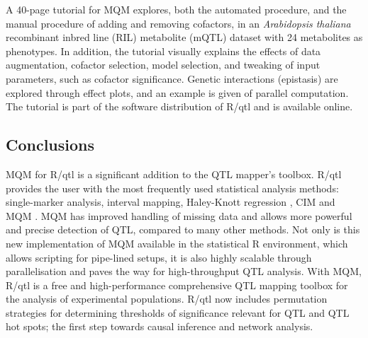 \documentclass[8pt, twoside, a5paper]{report}
\begin{document}
A 40-page tutorial for MQM explores, both the automated procedure, and the manual procedure of adding and removing 
cofactors, in an \emph{Arabidopsis thaliana} recombinant inbred line (RIL) metabolite (mQTL) dataset with 24 metabolites 
as phenotypes\cite{Fu:2007}. In addition, the tutorial visually explains the effects of data augmentation, cofactor 
selection, model selection, and tweaking of input parameters, such as cofactor significance. Genetic interactions 
(epistasis) are explored through effect plots, and an example is given of parallel computation. The tutorial is part 
of the software distribution of R/qtl and is available online.

\subsection{Conclusions}
MQM for R/qtl is a significant addition to the QTL mapper's toolbox. R/qtl provides the user with the most frequently 
used statistical analysis methods: single-marker analysis, interval mapping, Haley-Knott regression \cite{Haley:1992}, 
CIM \cite{Zeng:1994} and MQM \cite{Jansen:1994a}.  MQM has improved handling of missing data and allows more powerful 
and precise detection of QTL, compared to many other methods. Not only is this new implementation of MQM available in the
statistical R environment, which allows scripting for pipe-lined setups, it is also highly scalable through 
parallelisation and paves the way for high-throughput QTL analysis. With MQM, R/qtl is a free and high-performance 
comprehensive QTL mapping toolbox for the analysis of experimental populations. R/qtl now includes permutation strategies 
for determining thresholds of significance relevant for QTL and QTL hot spots; the first step towards causal inference and
network analysis.
\end{document}
